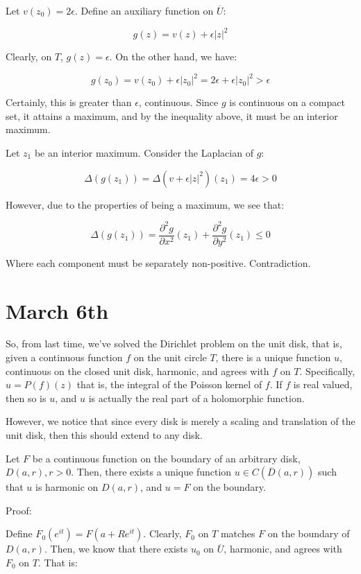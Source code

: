 \documentclass[10pt]{article}
\begin{document}
Let $v(z_0) = 2 \epsilon$. Define an auxiliary function on $\overline{U}$:

$$ g(z) = v(z) + \epsilon |z|^2 $$

Clearly, on $T$, $g(z) = \epsilon$. On the other hand, we have:

$$ g(z_0) = v(z_0) + \epsilon |z_0|^2 = 2\epsilon + \epsilon |z_0|^2 > \epsilon$$

Certainly, this is greater than $\epsilon$, continuous. Since $g$ is continuous on a compact set, it attains a maximum, and by the inequality above, it must be an interior maximum.

Let $z_1$ be an interior maximum. Consider the Laplacian of $g$:

$$ \Delta (g(z_1)) = \Delta (v + \epsilon |z|^2)(z_1) = 4 \epsilon  > 0$$

However, due to the properties of being a maximum, we see that:

$$ \Delta (g(z_1)) = \frac{\partial^2 g}{\partial x^2}(z_1) + \frac{\partial^2 g}{\partial y^2}(z_1)  \leq 0$$

Where each component must be separately non-positive. Contradiction.

\section*{March 6th}

So, from last time, we’ve solved the Dirichlet problem on the unit disk, that is, given a continuous function $f$ on the unit circle $T$, there is a unique function $u$, continuous on the closed unit disk, harmonic, and agrees with $f$ on $T$. Specifically, $u = P(f)(z)$ that is, the integral of the Poisson kernel of $f$. If $f$ is real valued, then so is $u$, and $u$ is actually the real part of a holomorphic function.

However, we notice that since every disk is merely a scaling and translation of the unit disk, then this should extend to any disk. 

Let $F$ be a continuous function on the boundary of an arbitrary disk, $D(a,r), r > 0$. Then, there exists a unique function $u \in C(\overline{D}(a,r))$ such that $u$ is harmonic on $D(a,r)$, and $u = F$ on the boundary. 

Proof:

Define $F_0(e^{it}) = F(a + Re^{it})$. Clearly, $F_0$ on $T$ matches $F$ on the boundary of $D(a,r)$. Then, we know that there exists $u_0$ on $\overline{U}$, harmonic, and agrees with $F_0$ on $T$. That is:
\end{document}
